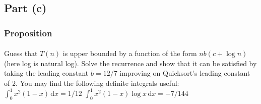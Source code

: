 \documentclass{article}
\begin{document}
\subsection{Part (c)}
\subsubsection{Proposition}

\paragraph{\indent}
Guess that \(T(n)\) is upper bounded by a function of the form \(nb(c + \log n)\) (here log is
natural log). Solve the recurrence and show that it can be satisfied by taking the leading
constant \(b = 12/7\)  improving on Quicksort's leading constant of 2. You may find the
following definite integrals useful: \(\int_0^1 \! x^{2}(1-x) \, \mathrm{d}x = 1/12\)
\(\int_0^1 \! x^{2}(1-x)\log x \, \mathrm{d}x = -7/144\)
\end{document}
